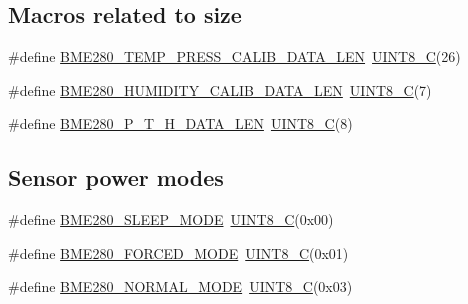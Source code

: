 \subsection*{Macros related to size}
\begin{DoxyCompactItemize}
\item 
\#define \hyperlink{group___b_m_e280_gab44aa25677fa7fcab0a4ccc59b050286}{B\+M\+E280\+\_\+\+T\+E\+M\+P\+\_\+\+P\+R\+E\+S\+S\+\_\+\+C\+A\+L\+I\+B\+\_\+\+D\+A\+T\+A\+\_\+\+L\+EN}~\hyperlink{group___b_m_e280_gacd2aa09844a8a245cf7fdbb808e215e5}{U\+I\+N\+T8\+\_\+C}(26)
\item 
\#define \hyperlink{group___b_m_e280_ga3768333f53ae57f3047838552e7771d5}{B\+M\+E280\+\_\+\+H\+U\+M\+I\+D\+I\+T\+Y\+\_\+\+C\+A\+L\+I\+B\+\_\+\+D\+A\+T\+A\+\_\+\+L\+EN}~\hyperlink{group___b_m_e280_gacd2aa09844a8a245cf7fdbb808e215e5}{U\+I\+N\+T8\+\_\+C}(7)
\item 
\#define \hyperlink{group___b_m_e280_gaf4fd5bc6f8cc635fe961cc20acfcbe5c}{B\+M\+E280\+\_\+\+P\+\_\+\+T\+\_\+\+H\+\_\+\+D\+A\+T\+A\+\_\+\+L\+EN}~\hyperlink{group___b_m_e280_gacd2aa09844a8a245cf7fdbb808e215e5}{U\+I\+N\+T8\+\_\+C}(8)
\end{DoxyCompactItemize}
\subsection*{Sensor power modes}
\begin{DoxyCompactItemize}
\item 
\#define \hyperlink{group___b_m_e280_ga4db27e6a138fa0ba5c2f5779467b5871}{B\+M\+E280\+\_\+\+S\+L\+E\+E\+P\+\_\+\+M\+O\+DE}~\hyperlink{group___b_m_e280_gacd2aa09844a8a245cf7fdbb808e215e5}{U\+I\+N\+T8\+\_\+C}(0x00)
\item 
\#define \hyperlink{group___b_m_e280_gae59bb15caa6e0a75e373286eacb5abc4}{B\+M\+E280\+\_\+\+F\+O\+R\+C\+E\+D\+\_\+\+M\+O\+DE}~\hyperlink{group___b_m_e280_gacd2aa09844a8a245cf7fdbb808e215e5}{U\+I\+N\+T8\+\_\+C}(0x01)
\item 
\#define \hyperlink{group___b_m_e280_ga8a9c2aa9289d646803badb7d7fdbd5cb}{B\+M\+E280\+\_\+\+N\+O\+R\+M\+A\+L\+\_\+\+M\+O\+DE}~\hyperlink{group___b_m_e280_gacd2aa09844a8a245cf7fdbb808e215e5}{U\+I\+N\+T8\+\_\+C}(0x03)
\end{DoxyCompactItemize}
